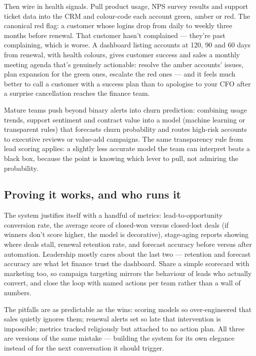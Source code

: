 Then wire in health signals. Pull product usage, NPS survey results and support ticket data into the CRM and colour-code each account green, amber or red. The canonical red flag: a customer whose logins drop from daily to weekly three months before renewal. That customer hasn't complained — they're past complaining, which is worse. A dashboard listing accounts at 120, 90 and 60 days from renewal, with health colours, gives customer success and sales a monthly meeting agenda that's genuinely actionable: resolve the amber accounts' issues, plan expansion for the green ones, escalate the red ones — and it feels much better to call a customer with a success plan than to apologise to your CFO after a surprise cancellation reaches the finance team.


Mature teams push beyond binary alerts into churn prediction: combining usage trends, support sentiment and contract value into a model (machine learning or transparent rules) that forecasts churn probability and routes high-risk accounts to executive reviews or value-add campaigns. The same transparency rule from lead scoring applies: a slightly less accurate model the team can interpret beats a black box, because the point is knowing which lever to pull, not admiring the probability.



\subsection{Proving it works, and who runs it}


The system justifies itself with a handful of metrics: lead-to-opportunity conversion rate, the average score of closed-won versus closed-lost deals (if winners don't score higher, the model is decorative), stage-aging reports showing where deals stall, renewal retention rate, and forecast accuracy before versus after automation. Leadership mostly cares about the last two — retention and forecast accuracy are what let finance trust the dashboard. Share a simple scorecard with marketing too, so campaign targeting mirrors the behaviour of leads who actually convert, and close the loop with named actions per team rather than a wall of numbers.


The pitfalls are as predictable as the wins: scoring models so over-engineered that sales quietly ignores them; renewal alerts set so late that intervention is impossible; metrics tracked religiously but attached to no action plan. All three are versions of the same mistake — building the system for its own elegance instead of for the next conversation it should trigger.



